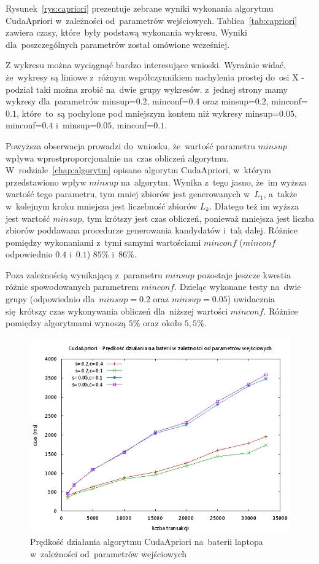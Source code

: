 Rysunek~\ref{rys:capriori} prezentuje zebrane wyniki wykonania algorytmu CudaApriori w~zależności od~parametrów wejściowych. Tablica~\ref{tab:capriori} zawiera czasy, które~były podstawą wykonania wykresu. Wyniki dla~poszczególnych parametrów został omówione wcześniej. 

Z wykresu można wyciągnąć bardzo interesujące wnioski. Wyraźnie widać, że~wykresy są liniowe z~różnym współczynnikiem nachylenia prostej do~osi X - podział taki można zrobić na~dwie grupy wykresów. z~jednej strony mamy wykresy dla~parametrów minsup=$0.2$, minconf=$0.4$ oraz minsup=$0.2$, minconf=$0.1$, które~to~są pochylone pod mniejszym kontem niż wykresy minsup=$0.05$, minconf=$0.4$ i~minsup=$0.05$, minconf=$0.1$. 

Powyższa obserwacja prowadzi do~wniosku, że~wartość parametru $minsup$ wpływa wprostproporcjonalnie na~czas obliczeń algorytmu. W~rodziale~\ref{chap:algorytm} opisano algorytm CudaApriori, w~którym przedstawiono wpływ $minsup$ na~algorytm. Wynika z~tego jasno, że~im wyższa wartość tego parametru, tym mniej zbiorów jest generowanych w~$L_1$, a~także w~kolejnym kroku mniejsza jest liczebność zbiorów $L_k$. Dlatego też im wyższa jest wartość $minsup$, tym krótszy jest czas obliczeń, ponieważ mniejsza jest liczba zbiorów poddawana procedurze generowania kandydatów i~tak dalej. Różnice pomiędzy wykonaniami z~tymi samymi wartościami $minconf$ ($minconf$ odpowiednio $0.4$ i~$0.1$) $85\%$ i~$86\%$.

Poza zależnością wynikającą z~parametru $minsup$ pozostaje jeszcze kwestia różnic spowodowanych parametrem $minconf$. Dzieląc wykonane testy na~dwie grupy (odpowiednio dla~$minsup=0.2$ oraz $minsup=0.05$) uwidacznia się~krótszy czas wykonywania obliczeń dla~niższej wartości $minconf$. Różnice pomiędzy algorytmami wynoszą $5\%$ oraz około $5,5\%$. 

\begin{figure}[H]
\centering
\includegraphics[width=1.1\textwidth]{figures/06/capriori_bat.png}
\caption{Prędkość działania algorytmu CudaApriori na~baterii laptopa w~zależności od~parametrów wejściowych\label{rys:capriori_bat}}
\end{figure}

